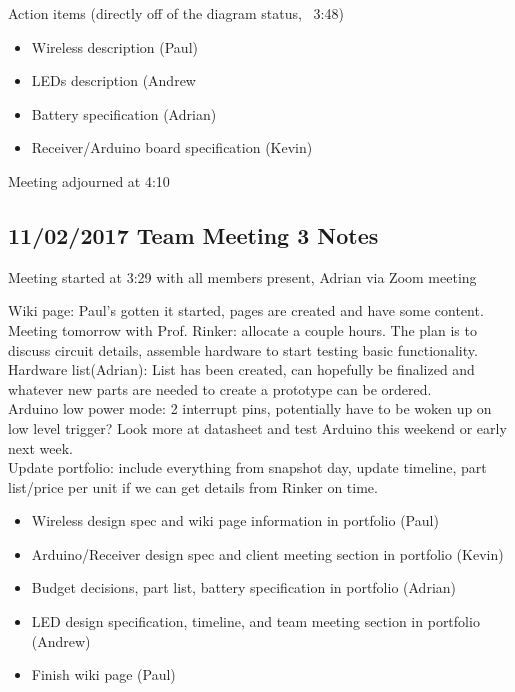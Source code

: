 \documentclass[12pt]{article}
\begin{document}
		\noindent
		Action items (directly off of the diagram status, ~3:48)
		\begin{itemize}
			\item Wireless description (Paul)
			\item LEDs description (Andrew
			\item Battery specification (Adrian)
			\item Receiver/Arduino board specification (Kevin)
		\end{itemize}

		\noindent
		Meeting adjourned at 4:10
	
	\subsection{11/02/2017 Team Meeting 3 Notes}
	Meeting started at 3:29 with all members present, Adrian via Zoom meeting

	\noindent
	Wiki page: Paul’s gotten it started, pages are created and have some content.\\
	
	\noindent
	Meeting tomorrow with Prof. Rinker: allocate a couple hours. The plan is to discuss circuit details, 		assemble hardware to start testing basic functionality.\\ 
	
	\noindent
	Hardware list(Adrian): List has been created, can hopefully be finalized and whatever new parts are 		needed 	to create a prototype can be ordered.\\
	
	\noindent
	Arduino low power mode: 2 interrupt pins, potentially have to be woken up on low level trigger? Look 		more at datasheet and test Arduino this weekend or early next week.\\
	
	\noindent
	Update portfolio: include everything from snapshot day, update timeline, part list/price per unit if we 	can get details from Rinker on time.\\
\begin{itemize}
\item Wireless design spec and wiki page information in portfolio (Paul)
\item Arduino/Receiver design spec and client meeting section in portfolio (Kevin)
\item  Budget decisions, part list, battery specification in portfolio (Adrian)
\item LED design specification, timeline, and team meeting section in portfolio (Andrew)
\item Finish wiki page (Paul)\\
\end{itemize}
\end{document}
